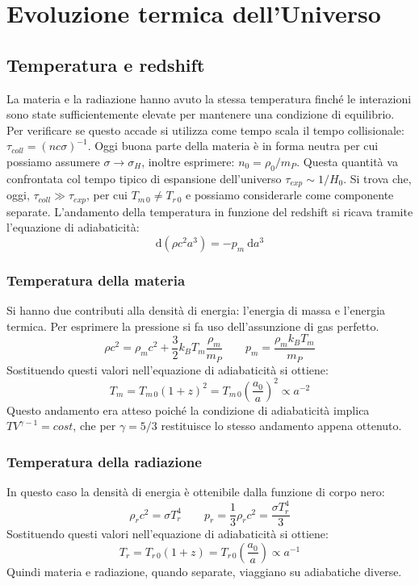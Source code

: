 \chapter{Evoluzione termica dell'Universo}\label{3:ch}


\section{Temperatura e redshift}
La materia e la radiazione hanno avuto la stessa temperatura finché le interazioni sono state sufficientemente elevate per mantenere una condizione di equilibrio. Per verificare se questo accade si utilizza come tempo scala il tempo collisionale: $\tau_{coll}=(n c\sigma )^{-1}$. Oggi buona parte della materia è in forma neutra per cui possiamo assumere $\sigma \rightarrow \sigma_H$, inoltre  esprimere: $n_0 = \rho_0 / m_P$. Questa quantità va confrontata col tempo tipico di espansione dell'universo $\tau_{exp} \sim 1/H_0$. Si trova che, oggi, $\tau_{coll} \gg \tau_{exp}$, per cui $T_{m\, 0} \neq T_{r\, 0}$ e possiamo considerarle come componente separate.
L'andamento della temperatura in funzione del redshift si ricava tramite l'equazione di adiabaticità:
$$
\mathrm{d}(\rho c^2 a^3) = - p_m\: \mathrm{d}a^3
$$


\subsection{Temperatura della materia}
Si hanno due contributi alla densità di energia: l'energia di massa e l'energia termica. Per esprimere la pressione si fa uso dell'assunzione di gas perfetto. 
$$
 \rho c^2 = \rho_m c^2 + \frac{3}{2}k_B T_m \frac{\rho_m}{m_P} \qquad p_m = \frac{\rho_m k_B T_m}{m_P}
$$
Sostituendo questi valori nell'equazione di adiabaticità si ottiene:
\begin{equation}
    T_m = T_{m\, 0} (1+z)^2 = T_{m\, 0}\left ( \frac{a_0}{a}\right )^2  \propto a^{-2}
\end{equation}
Questo andamento era atteso poiché la condizione di adiabaticità implica $TV^{\gamma -1} = cost$, che per $\gamma=5/3$ restituisce lo stesso andamento appena ottenuto.

\subsection{Temperatura della radiazione}
In questo caso la densità di energia è ottenibile dalla funzione di corpo nero:
$$
 \rho_r c^2 = \sigma T_r^4 \qquad p_r = \frac{1}{3}\rho_r c^2 = \frac{\sigma T_r^4}{3}
$$
Sostituendo questi valori nell'equazione di adiabaticità si ottiene:
\begin{equation}
    T_r = T_{r\, 0} (1+z) = T_{r\, 0}\left ( \frac{a_0}{a}\right )  \propto a^{-1}
\end{equation}
Quindi materia e radiazione, quando separate, viaggiano su adiabatiche diverse.

